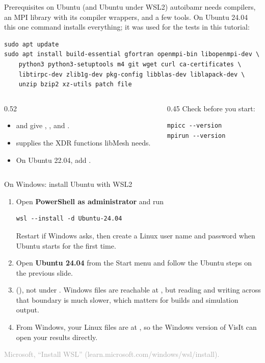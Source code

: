 \documentclass[aspectratio=169,11pt]{beamer}
\newcommand{\sourcecredit}[1]{\vfill\hfill{\tiny\textcolor{DarkGray}{#1}}}
\begin{document}
\begin{frame}[fragile]{Prerequisites on Ubuntu (and Ubuntu under WSL2)}
autoibamr needs compilers, an MPI library with its compiler wrappers, and a few tools. On Ubuntu 24.04 this one command installs everything; it was used for the tests in this tutorial:
\begin{lstlisting}[style=shell]
sudo apt update
sudo apt install build-essential gfortran openmpi-bin libopenmpi-dev \
    python3 python3-setuptools m4 git wget curl ca-certificates \
    libtirpc-dev zlib1g-dev pkg-config libblas-dev liblapack-dev \
    unzip bzip2 xz-utils patch file
\end{lstlisting}
\begin{columns}[T,onlytextwidth]
\begin{column}{0.52\textwidth}
\begin{itemize}\small
  \item \code{openmpi-bin} and  give , ,  and .
  \item \code{libtirpc-dev} supplies the XDR functions libMesh needs.
  \item On Ubuntu 22.04, add .
\end{itemize}
\end{column}
\begin{column}{0.45\textwidth}
Check before you start:
\begin{lstlisting}[style=shell]
mpicc --version
mpirun --version
\end{lstlisting}
\end{column}
\end{columns}
\end{frame}

\begin{frame}[fragile]{On Windows: install Ubuntu with WSL2}
\begin{enumerate}
  \item Open \textbf{PowerShell as administrator} and run
\begin{lstlisting}[style=shell]
wsl --install -d Ubuntu-24.04
\end{lstlisting}
  Restart if Windows asks, then create a Linux user name and password when Ubuntu starts for the first time.
  \item Open \textbf{Ubuntu 24.04} from the Start menu and follow the Ubuntu steps on the previous slide.
  \item {} (\code{\textasciitilde}), not under . Windows files are reachable at , but reading and writing across that boundary is much slower, which matters for builds and simulation output.
  \item From Windows, your Linux files are at , so the Windows version of VisIt can open your results directly.
\end{enumerate}
\sourcecredit{Microsoft, ``Install WSL'' (learn.microsoft.com/windows/wsl/install).}
\end{frame}
\end{document}
